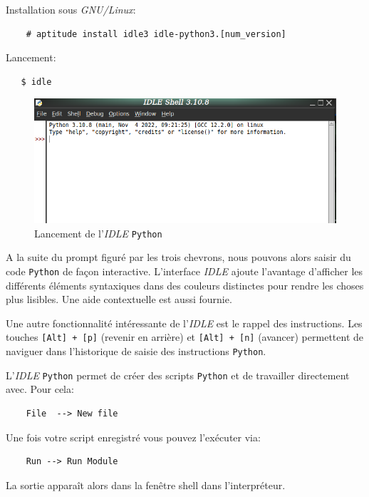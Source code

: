Installation sous \textit{GNU/Linux}: 
\begin{verbatim}
    # aptitude install idle3 idle-python3.[num_version]
\end{verbatim}
\medskip
 
Lancement:
\begin{verbatim}
   $ idle
\end{verbatim}
\medskip

\begin{figure}[h]
\begin{center}
\includegraphics[scale=0.4]{IMG/IDLE-01.png}
\caption{Lancement de l'\textit{IDLE} \texttt{Python}}
\end{center}
\end{figure}
\medskip

A la suite du prompt figuré par les trois chevrons, nous pouvons alors saisir du code \texttt{Python} de façon interactive. L'interface \textit{IDLE} ajoute l'avantage d'afficher les différents éléments syntaxiques dans des couleurs distinctes pour rendre les choses plus lisibles. Une aide contextuelle est aussi fournie.
\medskip

Une autre fonctionnalité intéressante de l'\textit{IDLE} est le rappel des instructions. Les touches \texttt{[Alt] + [p]} (revenir en arrière) et \texttt{[Alt] + [n]} (avancer) permettent de naviguer dans l'historique de saisie des instructions \texttt{Python}.
\medskip

L'\textit{IDLE} \texttt{Python} permet de créer des scripts \texttt{Python} et de travailler directement avec. Pour cela:
\begin{verbatim}
    File  --> New file
\end{verbatim}
\medskip

Une fois votre script enregistré vous pouvez l'exécuter via:
\begin{verbatim}
    Run --> Run Module
\end{verbatim}
\medskip

La sortie apparaît alors dans la fenêtre shell dans l'interpréteur.
\medskip

